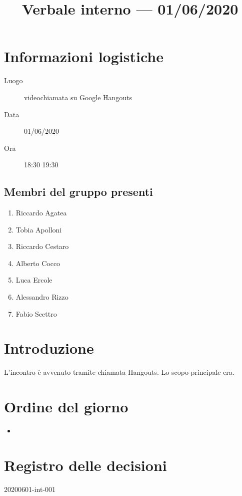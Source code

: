 \documentclass{article}
\title{Verbale interno --- 01/06/2020}
\begin{document}


\section{Informazioni logistiche}%
\label{sec:informazioni_logistiche}

\begin{description}
  \item [Luogo] videochiamata su Google Hangouts
  \item [Data] 01/06/2020
  \item [Ora] 18:30  19:30
\end{description}

\subsection{Membri del gruppo presenti}%
\label{sub:membri_del_gruppo_presenti}

\begin{enumerate}
  \item Riccardo Agatea
  \item Tobia Apolloni
  \item Riccardo Cestaro
  \item Alberto Cocco
  \item Luca Ercole
  \item Alessandro Rizzo
  \item Fabio Scettro
\end{enumerate}

\section{Introduzione}%
\label{sec:introduzione}
L'incontro è avvenuto tramite chiamata Hangouts.
Lo scopo principale era.

\section{Ordine del giorno}%
\label{sec:ordine_del_giorno}

\begin{itemize}
  \item
\end{itemize}

\section{}%
\label{sec:}

\newpage
\section{Registro delle decisioni}%
\label{sec:registro_delle_decisioni}

\begin{description}
  \item[20200601-int-001]
\end{description}

\end{document}
